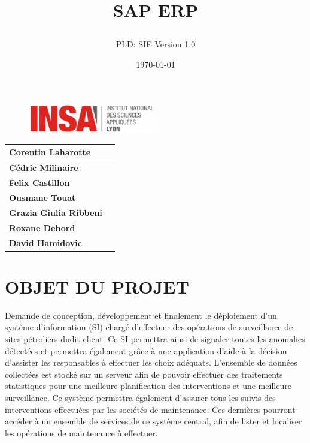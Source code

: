 \documentclass[]{scrartcl}
\title{SAP ERP
\subtitle{}
\author{PLD: SIE
Version 1.0}
\date{\today}}
\begin{document}
\maketitle

\begin{figure}[h]
	\centering
  \includegraphics[width=0.5\textwidth]{img/insa-logo}
	\label{fig:logo}
\end{figure}


\begin{center}
  \begin{tabular}{ | l | r | }
    \hline
    \textbf{Corentin Laharotte}\\ \hline
    \textbf{Cédric Milinaire }\\ \hline
    \textbf{Felix Castillon}\\ \hline
    \textbf{Ousmane Touat}\\ \hline
	\textbf{Grazia Giulia Ribbeni }\\ \hline
	\textbf{Roxane Debord} \\ \hline 
	    \textbf{David Hamidovic}\\ \hline
  \end{tabular}
\end{center}

\thispagestyle{empty}
\pagebreak
\vspace*{10pt}
\tableofcontents
\listoffigures
\newpage
\section{OBJET DU PROJET}
Demande de conception, développement et finalement le déploiement d'un système d'information (SI) chargé d'effectuer des opérations de surveillance de sites pétroliers dudit client. Ce SI permettra ainsi de signaler toutes les anomalies détectées et permettra également grâce à une application d'aide à la décision d'assister les responsables à effectuer les choix adéquats. L'ensemble de données collectées est stocké sur un serveur afin de pouvoir effectuer des traitements statistiques pour une meilleure planification des interventions et une meilleure surveillance. Ce système permettra également d'assurer tous les suivis des interventions effectuées par les sociétés de maintenance. Ces dernières pourront accéder à un ensemble de services de ce système central, afin de lister et localiser les opérations de maintenance à effectuer. \\
\end{document}

